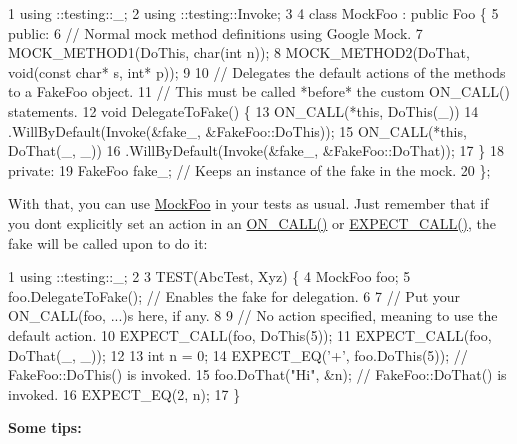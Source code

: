 \begin{DoxyCode}
1 using ::testing::\_;
2 using ::testing::Invoke;
3 
4 class MockFoo : public Foo \{
5  public:
6   // Normal mock method definitions using Google Mock.
7   MOCK\_METHOD1(DoThis, char(int n));
8   MOCK\_METHOD2(DoThat, void(const char* s, int* p));
9 
10   // Delegates the default actions of the methods to a FakeFoo object.
11   // This must be called *before* the custom ON\_CALL() statements.
12   void DelegateToFake() \{
13     ON\_CALL(*this, DoThis(\_))
14         .WillByDefault(Invoke(&fake\_, &FakeFoo::DoThis));
15     ON\_CALL(*this, DoThat(\_, \_))
16         .WillByDefault(Invoke(&fake\_, &FakeFoo::DoThat));
17   \}
18  private:
19   FakeFoo fake\_;  // Keeps an instance of the fake in the mock.
20 \};
\end{DoxyCode}


With that, you can use {\ttfamily \hyperlink{class_mock_foo}{Mock\+Foo}} in your tests as usual. Just remember that if you don\textquotesingle{}t explicitly set an action in an {\ttfamily \hyperlink{gmock-spec-builders_8h_a5b12ae6cf84f0a544ca811b380c37334}{O\+N\+\_\+\+C\+A\+L\+L()}} or {\ttfamily \hyperlink{gmock-spec-builders_8h_a535a6156de72c1a2e25a127e38ee5232}{E\+X\+P\+E\+C\+T\+\_\+\+C\+A\+L\+L()}}, the fake will be called upon to do it\+:


\begin{DoxyCode}
1 using ::testing::\_;
2 
3 TEST(AbcTest, Xyz) \{
4   MockFoo foo;
5   foo.DelegateToFake(); // Enables the fake for delegation.
6 
7   // Put your ON\_CALL(foo, ...)s here, if any.
8 
9   // No action specified, meaning to use the default action.
10   EXPECT\_CALL(foo, DoThis(5));
11   EXPECT\_CALL(foo, DoThat(\_, \_));
12 
13   int n = 0;
14   EXPECT\_EQ('+', foo.DoThis(5));  // FakeFoo::DoThis() is invoked.
15   foo.DoThat("Hi", &n);           // FakeFoo::DoThat() is invoked.
16   EXPECT\_EQ(2, n);
17 \}
\end{DoxyCode}


{\bfseries Some tips\+:}


